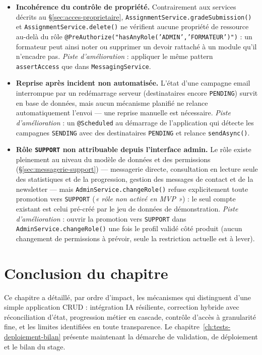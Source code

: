 \begin{itemize}
  \item \textbf{Incohérence du contrôle de propriété.} Contrairement aux
    services décrits au \S\ref{sec:acces-proprietaire},
    \texttt{AssignmentService.gradeSubmission()} et
    \texttt{AssignmentService.delete()} ne vérifient aucune propriété de
    ressource au-delà du rôle \texttt{@PreAuthorize("hasAnyRole('ADMIN','FORMATEUR')")} :
    un formateur peut ainsi noter ou supprimer un devoir rattaché à un
    module qu'il n'encadre pas. \emph{Piste d'amélioration} : appliquer le
    même pattern \texttt{assertAccess} que dans \texttt{MessagingService}.
  \item \textbf{Reprise après incident non automatisée.} L'état d'une
    campagne email interrompue par un redémarrage serveur (destinataires
    encore \texttt{PENDING}) survit en base de données, mais aucun
    mécanisme planifié ne relance automatiquement l'envoi --- une reprise
    manuelle est nécessaire. \emph{Piste d'amélioration} : un
    \texttt{@Scheduled} au démarrage de l'application qui détecte les
    campagnes \texttt{SENDING} avec des destinataires \texttt{PENDING} et
    relance \texttt{sendAsync()}.
  \item \textbf{Rôle \texttt{SUPPORT} non attribuable depuis l'interface
    admin.} Le rôle existe pleinement au niveau du modèle de données et des
    permissions (\S\ref{sec:messagerie-support}) --- messagerie directe,
    consultation en lecture seule des statistiques et de la progression,
    gestion des messages de contact et de la newsletter --- mais
    \texttt{AdminService.changeRole()} refuse explicitement toute
    promotion vers \texttt{SUPPORT} (\emph{« rôle non activé en MVP »}) : le
    seul compte existant est celui pré-créé par le jeu de données de
    démonstration. \emph{Piste d'amélioration} : ouvrir la promotion vers
    \texttt{SUPPORT} dans \texttt{AdminService.changeRole()} une fois le
    profil validé côté produit (aucun changement de permissions à
    prévoir, seule la restriction actuelle est à lever).
\end{itemize}

\section*{Conclusion du chapitre}
Ce chapitre a détaillé, par ordre d'impact, les mécanismes qui distinguent
\Entreprise{} d'une simple application CRUD : intégration IA résiliente,
correction hybride avec réconciliation d'état, progression métier en
cascade, contrôle d'accès à granularité fine, et les limites identifiées
en toute transparence. Le chapitre~\ref{ch:tests-deploiement-bilan} présente
maintenant la démarche de validation, de déploiement et le bilan du stage.
